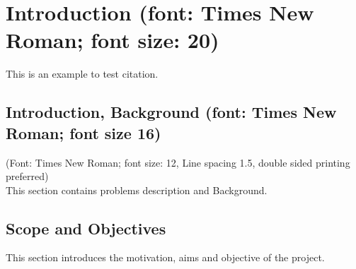 \section{Introduction (font: Times New Roman; font size: 20)}

This is an example to test citation.~\cite{author2020bookchapter,author2021journal,author2022conference,author2023online}

\subsection{Introduction, Background (font: Times New Roman; font size 16)}

(Font: Times New Roman; font size: 12, Line spacing 1.5, double sided printing preferred) \\
This section contains problems description and Background. 

\subsection{Scope and Objectives}

This section introduces the motivation, aims and objective of the project.